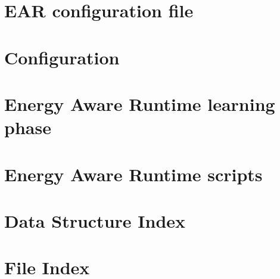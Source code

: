 \documentclass[twoside]{book}
\newcommand{\+}{\discretionary{\mbox{\scriptsize$\hookleftarrow$}}{}{}}
\begin{document}
\chapter{E\+AR configuration file}
\label{md_etc_conf_README}
\hypertarget{md_etc_conf_README}{}

\chapter{Configuration}
\label{md_etc_README}
\hypertarget{md_etc_README}{}

\chapter{Energy Aware Runtime learning phase}
\label{md_etc_scripts_learning_README}
\hypertarget{md_etc_scripts_learning_README}{}

\chapter{Energy Aware Runtime scripts}
\label{md_etc_scripts_README}
\hypertarget{md_etc_scripts_README}{}

\chapter{Data Structure Index}

\chapter{File Index}

\end{document}

